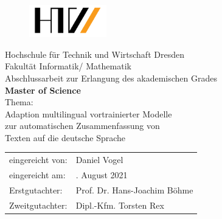 \begin{titlepage}

\begin{figure}[t]
 \centering
 \includegraphics[width=0.3\textwidth]{./source/images/htwdresden.png}
\end{figure}

\begin{center}
\large{Hochschule für Technik und Wirtschaft Dresden} \\[1ex]
\large{Fakultät Informatik/ Mathematik} \\[11ex]
\Large{Abschlussarbeit zur Erlangung des akademischen Grades} \\[2ex]
\LARGE{\textbf{Master of Science}} \\[8ex]
\Large{Thema:} \\[1ex]
\Large{Adaption multilingual vortrainierter Modelle} \\[1ex]
\Large{zur automatischen Zusammenfassung von} \\[1ex]
\Large{Texten auf die deutsche Sprache} \\[11ex]
\end{center}

\begin{flushleft}
\begin{tabular}{ll}
eingereicht von: & \quad Daniel Vogel \\[2ex]
eingereicht am: & \quad 8. August 2021 \\[2ex]
Erstgutachter:  & \quad Prof. Dr. Hans-Joachim Böhme \\[2ex]
Zweitgutachter: & \quad Dipl.-Kfm. Torsten Rex \\[2ex]
\end{tabular}
\end{flushleft}

\end{titlepage}
